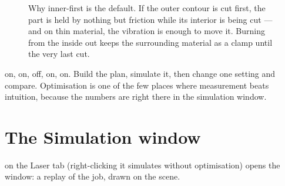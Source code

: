 \begin{figure}[htbp]
\centering
{}
\caption{Why inner-first is the default. If the outer contour is cut first, the
part is held by nothing but friction while its interior is being cut --- and on
thin material, the vibration is enough to move it. Burning from the inside out
keeps the surrounding material as a clamp until the very last cut.}
\label{fig:innerfirst}
\end{figure}

\begin{tipbox}
 on,  on, 
off,  on,  on. Build
the plan, simulate it, then change one setting and compare. Optimisation is one of
the few places where measurement beats intuition, because the numbers are right
there in the simulation window.
\end{tipbox}

\section{The Simulation window}

 on the Laser tab (right-clicking it simulates without
optimisation) opens the  window: a replay of the job, drawn on
the scene.


